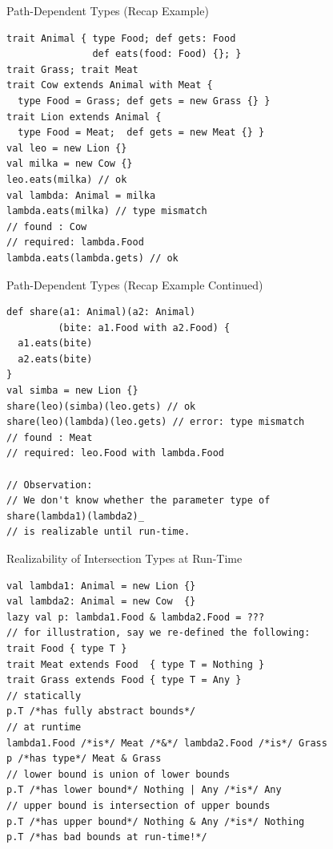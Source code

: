 \documentclass{beamer}
\begin{document}
\begin{frame}[fragile]{Path-Dependent Types (Recap Example)}
\begin{verbatim}
trait Animal { type Food; def gets: Food
               def eats(food: Food) {}; }
trait Grass; trait Meat
trait Cow extends Animal with Meat {
  type Food = Grass; def gets = new Grass {} }
trait Lion extends Animal {
  type Food = Meat;  def gets = new Meat {} }
val leo = new Lion {}
val milka = new Cow {}
leo.eats(milka) // ok
val lambda: Animal = milka
lambda.eats(milka) // type mismatch
// found : Cow
// required: lambda.Food
lambda.eats(lambda.gets) // ok
\end{verbatim}
\end{frame}

\begin{frame}[fragile]{Path-Dependent Types (Recap Example Continued)}
\begin{verbatim}
def share(a1: Animal)(a2: Animal)
         (bite: a1.Food with a2.Food) {
  a1.eats(bite)
  a2.eats(bite)
}
val simba = new Lion {}
share(leo)(simba)(leo.gets) // ok
share(leo)(lambda)(leo.gets) // error: type mismatch
// found : Meat
// required: leo.Food with lambda.Food

// Observation:
// We don't know whether the parameter type of
share(lambda1)(lambda2)_
// is realizable until run-time.
\end{verbatim}
\end{frame}

\begin{frame}[fragile]{Realizability of Intersection Types at Run-Time}
\begin{verbatim}
val lambda1: Animal = new Lion {}
val lambda2: Animal = new Cow  {}
lazy val p: lambda1.Food & lambda2.Food = ???
// for illustration, say we re-defined the following:
trait Food { type T }
trait Meat extends Food  { type T = Nothing }
trait Grass extends Food { type T = Any }
// statically
p.T /*has fully abstract bounds*/
// at runtime
lambda1.Food /*is*/ Meat /*&*/ lambda2.Food /*is*/ Grass
p /*has type*/ Meat & Grass
// lower bound is union of lower bounds
p.T /*has lower bound*/ Nothing | Any /*is*/ Any
// upper bound is intersection of upper bounds
p.T /*has upper bound*/ Nothing & Any /*is*/ Nothing
p.T /*has bad bounds at run-time!*/
\end{verbatim}
\end{frame}
\end{document}

